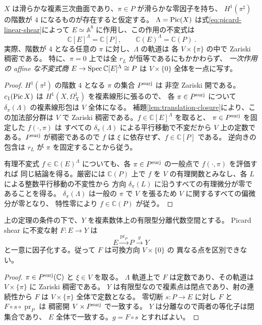 \begin{theorem}
\label{thm:picard-linear-invariants}
$X$ は滑らかな複素三次曲面であり、$\pi\in P$ が滑らかな零因子を持ち、
$H^1(\pi^\sharp)$ の階数が $4$ になるものが存在すると仮定する。
$\Lambda=\operatorname{Pic}(X)$ は式\eqref{eq:picard-linear-shear}によって
$E\simeq\mathbb A^8$ に作用し、この作用の不変式は
\begin{equation}\label{eq:picard-invariants}
 \boxed{\ \mathbb C[E]^\Lambda=\mathbb C[P],\qquad
 \mathbb C(E)^\Lambda=\mathbb C(P)\ }.
\end{equation}
実際、階数が $4$ となる任意の $\pi$ に対し、$\Lambda$ の軌道は
各 $V\times\{\pi\}$ の中で Zariski 稠密である。
特に、$\pi=0$ 上では全 $r_L$ が恒等であるにもかかわらず、
\emph{一次作用の affine な不変式商} $E\to\operatorname{Spec}\mathbb C[E]^\Lambda\cong P$
は $V\times\{0\}$ 全体を一点に写す。
\end{theorem}
\begin{proof}
$H^1(\pi^\sharp)$ の階数 $4$ となる $\pi$ の集合 $P^{\rm surj}$ は
非空 Zariski 開である。$c_1(\operatorname{Pic} X)$ は
$H^1(X,\Omega_X^1)$ を複素線形に張るので、
各 $\pi\in P^{\rm surj}$ について
$\delta_\pi(\Lambda)$ の複素線形包は $V$ 全体になる。
補題\ref{lem:translation-closure}により、この加法部分群は $V$ で
Zariski 稠密である。$f\in\mathbb C[E]^\Lambda$ を取ると、
$\pi\in P^{\rm surj}$ を固定した $f(\cdot,\pi)$ は
すべての $\delta_\pi(\Lambda)$ による平行移動で不変だから
$V$ 上の定数である。$P^{\rm surj}$ が稠密であるので
$f$ は $\xi$ に依存せず、$f\in\mathbb C[P]$ である。
逆向きの包含は $r_L$ が $\pi$ を固定することから従う。

有理不変式 $f\in\mathbb C(E)^\Lambda$ についても、各
$\pi\in P^{\rm surj}$ の一般点で $f(\cdot,\pi)$ を評価すれば
同じ結論を得る。厳密には $\mathbb C(P)$ 上で $f$ を
$V$ の有理関数とみなし、各 $L$ による整数平行移動の不変性から
方向 $\delta_\pi(L)$ に沿うすべての有理微分が零であることを得る。
$\delta_\pi(\Lambda)$ は一般の $\pi$ で $V$ を張るため
$V$ に関するすべての偏微分が零となり、
特性零により $f\in\mathbb C(P)$ が従う。
\end{proof}

\begin{corollary}[分離的な一次粗商の限界]
\label{cor:separated-linear-quotient}
上の定理の条件の下で、$Y$ を複素数体上の有限型分離代数空間とする。
Picard shear に不変な射 $F:E\to Y$ は
\[
 E\xrightarrow{\operatorname{pr}_P}P\xrightarrow{g}Y
\]
と一意に因子化する。従って $F$ は可換方向 $V\times\{0\}$ の
異なる点を区別できない。
\end{corollary}
\begin{proof}
$\pi\in P^{\rm surj}(\mathbb C)$ と $\xi\in V$ を取る。
$\Lambda$ 軌道上で $F$ は定数であり、その軌道は
$V\times\{\pi\}$ に Zariski 稠密である。
$Y$ は有限型なので複素点は閉点であり、射の連続性から
$F$ は $V\times\{\pi\}$ 全体で定数となる。
零切断 $s:P\to E$ に対し $F$ と
$F\circ s\circ\operatorname{pr}_P$ は
稠密開 $V\times P^{\rm surj}$ で一致する。
$Y$ は分離なので両者の等化子は閉集合であり、
$E$ 全体で一致する。$g=F\circ s$ とすればよい。
\end{proof}


